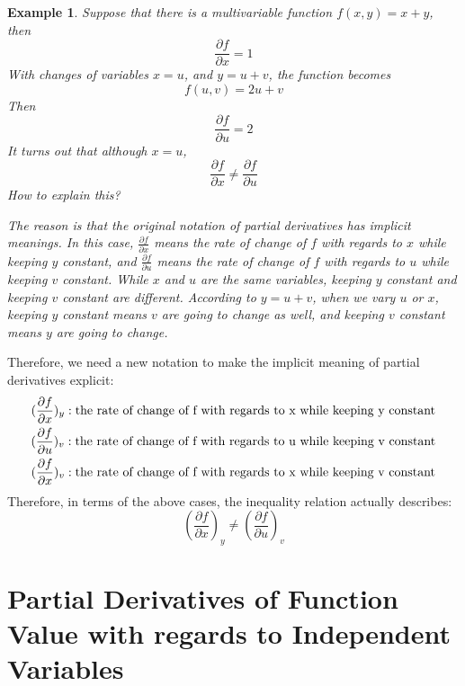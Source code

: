 \documentclass{article}
\newtheorem{example}{Example}
\begin{document}
\begin{example}
  Suppose that there is a multivariable function $f(x, y) = x + y$, then
  \begin{equation*}
    \frac{\partial f}{\partial x} = 1
  \end{equation*}
  With changes of variables $x = u$, and $y = u + v$, the function becomes
  \begin{equation*}
    f(u, v) = 2u + v
  \end{equation*}
  Then
  \begin{equation*}
    \frac{\partial f}{\partial u} = 2
  \end{equation*}
  It turns out that although $x = u$,
  \begin{equation*}
    \frac{\partial f}{\partial x} \neq \frac{\partial f}{\partial u}
  \end{equation*}
  How to explain this?

  The reason is that the original notation of partial derivatives has implicit 
  meanings. In this case, $\frac{\partial f}{\partial x}$ means the rate of 
  change of $f$ with regards to $x$ while keeping $y$ constant, and 
  $\frac{\partial f}{\partial u}$ means the rate of change of $f$ with regards 
  to $u$ while keeping $v$ constant. While $x$ and $u$ are the same variables, 
  keeping $y$ constant and keeping $v$ constant are different. According to 
  $y = u + v$, when we vary $u$ or $x$, keeping $y$ constant means $v$ are going 
  to change as well, and keeping $v$ constant means $y$ are going to change.
\end{example}

Therefore, we need a new notation to make the implicit meaning of partial 
derivatives explicit:
\begin{gather*}
  (\frac{\partial f}{\partial x})_y: \textnormal{the rate of change of f with regards to x while keeping y constant} \\
  (\frac{\partial f}{\partial u})_v: \textnormal{the rate of change of f with regards to u while keeping v constant} \\
  (\frac{\partial f}{\partial x})_v: \textnormal{the rate of change of f with regards to x while keeping v constant} \\
\end{gather*}
Therefore, in terms of the above cases, the inequality relation actually 
describes:
\begin{equation*}
  (\frac{\partial f}{\partial x})_y \neq (\frac{\partial f}{\partial u})_v
\end{equation*}

\section{Partial Derivatives of Function Value with regards to Independent Variables}
\end{document}
